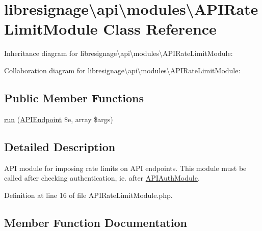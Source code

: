 \hypertarget{classlibresignage_1_1api_1_1modules_1_1APIRateLimitModule}{}\section{libresignage\textbackslash{}api\textbackslash{}modules\textbackslash{}A\+P\+I\+Rate\+Limit\+Module Class Reference}
\label{classlibresignage_1_1api_1_1modules_1_1APIRateLimitModule}


Inheritance diagram for libresignage\textbackslash{}api\textbackslash{}modules\textbackslash{}A\+P\+I\+Rate\+Limit\+Module\+:


Collaboration diagram for libresignage\textbackslash{}api\textbackslash{}modules\textbackslash{}A\+P\+I\+Rate\+Limit\+Module\+:
\subsection*{Public Member Functions}
\begin{DoxyCompactItemize}
\item 
\hyperlink{classlibresignage_1_1api_1_1modules_1_1APIRateLimitModule_ab9304abaa16b36fa79a57d50a90229bb}{run} (\hyperlink{classlibresignage_1_1api_1_1APIEndpoint}{A\+P\+I\+Endpoint} \$e, array \$args)
\end{DoxyCompactItemize}


\subsection{Detailed Description}
A\+PI module for imposing rate limits on A\+PI endpoints. This module must be called after checking authentication, ie. after \hyperlink{classlibresignage_1_1api_1_1modules_1_1APIAuthModule}{A\+P\+I\+Auth\+Module}. 

Definition at line 16 of file A\+P\+I\+Rate\+Limit\+Module.\+php.



\subsection{Member Function Documentation}
\mbox{\label{classlibresignage_1_1api_1_1modules_1_1APIRateLimitModule_ab9304abaa16b36fa79a57d50a90229bb}} 
